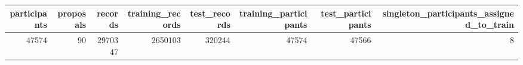 \begin{tabular}{rrrrrrrr}
\toprule
participants & proposals & records & training_records & test_records & training_participants & test_participants & singleton_participants_assigned_to_train \\
\midrule
47574 & 90 & 2970347 & 2650103 & 320244 & 47574 & 47566 & 8 \\
\bottomrule
\end{tabular}
